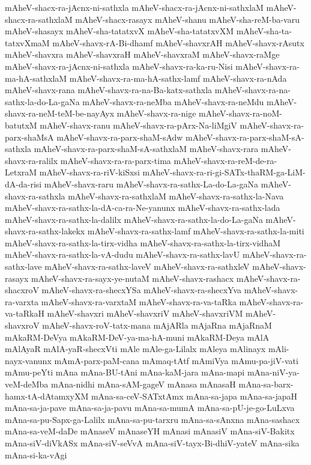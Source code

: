 {mAheV-shacx-ra-jAcnx-ni-sathxla
mAheV-shacx-ra-jAcnx-ni-sathxlaM
mAheV-shacx-ra-sathxlaM
mAheV-shacx-rasayx
mAheV-shanu
mAheV-sha-reM-ba-varu
mAheV-shasayx
mAheV-sha-tatatxvX
mAheV-sha-tatatxvXM
mAheV-sha-ta-tatxvXmaM
mAheV-shavx-rA-Bi-dhamf
mAheV-shavxrAH
mAheV-shavx-rAsutx
mAheV-shavxra
mAheV-shavxraH
mAheV-shavxraM
mAheV-shavx-raMge
mAheV-shavx-ra-jAcnx-ni-sathxla
mAheV-shavx-ra-ka-ru-Nisi
mAheV-shavx-ra-ma-hA-sathxlaM
mAheV-shavx-ra-ma-hA-sathx-lamf
mAheV-shavx-ra-nAda
mAheV-shavx-rana
mAheV-shavx-ra-na-Ba-katx-sathxla
mAheV-shavx-ra-na-sathx-la-do-La-gaNa
mAheV-shavx-ra-neMba
mAheV-shavx-ra-neMdu
mAheV-shavx-ra-neM-teM-be-nayAyx
mAheV-shavx-ra-nige
mAheV-shavx-ra-noM-batutxM
mAheV-shavx-ranu
mAheV-shavx-ra-pArx-Na-liMgiV
mAheV-shavx-ra-parx-shaMsA
mAheV-shavx-ra-parx-shaM-sAdw
mAheV-shavx-ra-parx-shaM-sA-sathxla
mAheV-shavx-ra-parx-shaM-sA-sathxlaM
mAheV-shavx-rara
mAheV-shavx-ra-ralilx
mAheV-shavx-ra-ra-parx-tima
mAheV-shavx-ra-reM-de-ra-LetxraM
mAheV-shavx-ra-riV-kiSxsi
mAheV-shavx-ra-ri-gi-SATx-thaRM-ga-LiM-dA-da-risi
mAheV-shavx-raru
mAheV-shavx-ra-sathx-La-do-La-gaNa
mAheV-shavx-ra-sathxla
mAheV-shavx-ra-sathxlaM
mAheV-shavx-ra-sathx-la-Nava
mAheV-shavx-ra-sathx-la-dA-ca-ra-Ne-yanunx
mAheV-shavx-ra-sathx-lada
mAheV-shavx-ra-sathx-la-dalilx
mAheV-shavx-ra-sathx-la-do-La-gaNa
mAheV-shavx-ra-sathx-lakekx
mAheV-shavx-ra-sathx-lamf
mAheV-shavx-ra-sathx-la-miti
mAheV-shavx-ra-sathx-la-tirx-vidha
mAheV-shavx-ra-sathx-la-tirx-vidhaM
mAheV-shavx-ra-sathx-la-vA-dudu
mAheV-shavx-ra-sathx-lavU
mAheV-shavx-ra-sathx-lave
mAheV-shavx-ra-sathx-laveV
mAheV-shavx-ra-sathxleV
mAheV-shavx-rasayx
mAheV-shavx-ra-sayx-ye-nutaM
mAheV-shavx-rashacx
mAheV-shavx-ra-shacxroV
mAheV-shavx-ra-shecxYSa
mAheV-shavx-ra-shecxYva
mAheV-shavx-ra-varxta
mAheV-shavx-ra-varxtaM
mAheV-shavx-ra-va-taRka
mAheV-shavx-ra-va-taRkaH
mAheV-shavxri
mAheV-shavxriV
mAheV-shavxriVM
mAheV-shavxroV
mAheV-shavx-roV-tatx-mana
mAjARla
mAjaRna
mAjaRnaM
mAkaRM-DeVya
mAkaRM-DeV-ya-ma-hA-muni
mAkaRM-Deya
mAlA
mAlAyaR
mAlA-yaR-shecxVti
mAle
mAle-ga-Lilalx
mAleya
mAlinayx
mAli-nayx-vanunx
mAmA-parx-paM-cana
mAmaq-tAtf
mAmiVya
mAmu-pa-jiV-vati
mAmu-peYti
mAna
mAna-BU-tAni
mAna-kaM-jara
mAna-mapi
mAna-niV-ya-veM-deMba
mAna-nidhi
mAna-sAM-gageV
mAnasa
mAnasaH
mAna-sa-barx-hamx-tA-dAtamxyXM
mAna-sa-ceV-SATxtAmx
mAna-sa-japa
mAna-sa-japaH
mAna-sa-ja-pave
mAna-sa-ja-pavu
mAna-sa-mumA
mAna-sa-pU-je-go-LuLxva
mAna-sa-pu-Sapx-ga-Lalilx
mAna-sa-pu-tarxru
mAna-sa-sAnxna
mAna-sashacx
mAna-sa-veM-daDe
mAnaseV
mAnaseYH
mAnasi
mAnasiV
mAna-siV-Bakitx
mAna-siV-diVkASx
mAna-siV-seVvA
mAna-siV-tayx-Bi-dhiV-yateV
mAna-sika
mAna-si-ka-vAgi
}
